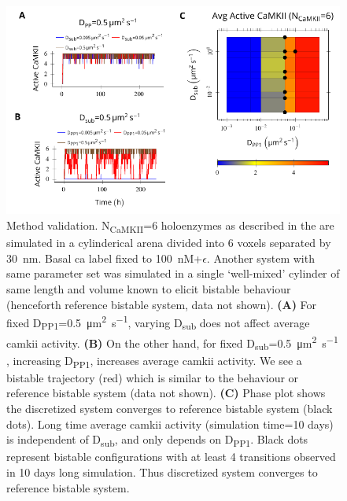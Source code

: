 \documentclass[9pt,lineno,doublespacing]{elife}
\newcommand\SUB[2]{#1\textsubscript{#2}}
\begin{document}
{\begin{figure}[ht!]
    \includegraphics[width=12cm]{./PaperFigures/elifeFigure7/figure_su_long_term_effect.pdf}
    \caption{Method validation. \SUB{N}{CaMKII}=6 holoenzymes as described in
        the  are simulated in a cylinderical arena divided
        into 6 voxels separated by \SI{30}{\nano\meter}. Basal \gls{ca} label
        fixed to \SI{100}{\nano M}+$\epsilon$. Another system with same
        parameter set was simulated in a single `well-mixed' cylinder of 
        same length and volume known to elicit bistable
        behaviour (henceforth reference bistable system, data not shown). 
        \textbf{(A)} For fixed \SUB{D}{PP1}=\SI{0.5}{\micro\meter\squared\per\second}, varying
        \SUB{D}{sub} does not affect average \gls{camkii} activity. 
        \textbf{(B)} On the other hand, for fixed
        \SUB{D}{sub}=\SI{0.5}{\micro\meter\squared\per\second} , increasing
        \SUB{D}{PP1}, increases average \gls{camkii} activity. We see a bistable
        trajectory (red) which is similar to the behaviour or reference bistable
        system (data not shown). \textbf{(C)} Phase plot shows the discretized
        system converges to reference bistable system (black dots). Long time
        average \Gls{camkii} activity (simulation time=10 days) is independent of 
        \SUB{D}{sub}, and only depends on \SUB{D}{PP1}. Black dots represent bistable
        configurations with at least 4 transitions observed in 10 days long
        simulation. Thus discretized system converges to reference bistable system.
    }\label{fig:method_validation} 


\end{figure}}
\end{document}
